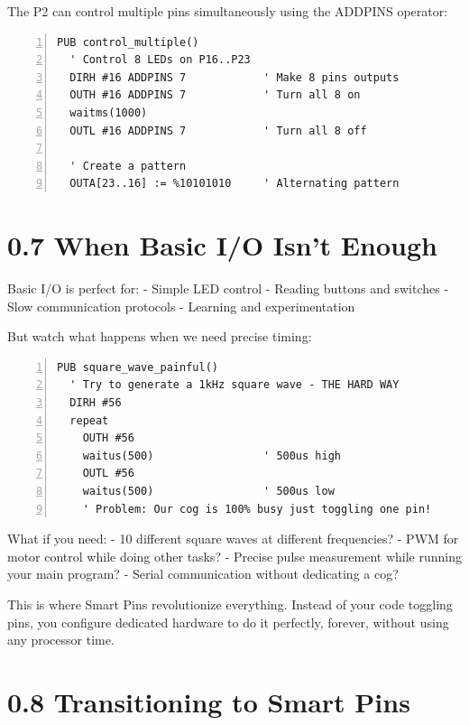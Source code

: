 \documentclass[11pt,a4paper,oneside,english]{book}
\begin{document}
The P2 can control multiple pins simultaneously using the ADDPINS
operator:

\begin{Spin2Block}
\begin{Verbatim}[numbers=left,numbersep=5pt,xleftmargin=15pt]
PUB control_multiple()
  ' Control 8 LEDs on P16..P23
  DIRH #16 ADDPINS 7            ' Make 8 pins outputs
  OUTH #16 ADDPINS 7            ' Turn all 8 on
  waitms(1000)
  OUTL #16 ADDPINS 7            ' Turn all 8 off
  
  ' Create a pattern
  OUTA[23..16] := %10101010     ' Alternating pattern
\end{Verbatim}
\end{Spin2Block}

\hypertarget{when-basic-io-isnt-enough}{%
\section{0.7 When Basic I/O Isn't
Enough}\label{when-basic-io-isnt-enough}}

Basic I/O is perfect for: - Simple LED control - Reading buttons and
switches - Slow communication protocols - Learning and experimentation

But watch what happens when we need precise timing:

\begin{Spin2Block}
\begin{Verbatim}[numbers=left,numbersep=5pt,xleftmargin=15pt]
PUB square_wave_painful()
  ' Try to generate a 1kHz square wave - THE HARD WAY
  DIRH #56
  repeat
    OUTH #56
    waitus(500)                 ' 500us high
    OUTL #56
    waitus(500)                 ' 500us low
    ' Problem: Our cog is 100% busy just toggling one pin!
\end{Verbatim}
\end{Spin2Block}

What if you need: - 10 different square waves at different frequencies?
- PWM for motor control while doing other tasks? - Precise pulse
measurement while running your main program? - Serial communication
without dedicating a cog?

This is where Smart Pins revolutionize everything. Instead of your code
toggling pins, you configure dedicated hardware to do it perfectly,
forever, without using any processor time.

\hypertarget{transitioning-to-smart-pins}{%
\section{0.8 Transitioning to Smart
Pins}\label{transitioning-to-smart-pins}}
\end{document}
